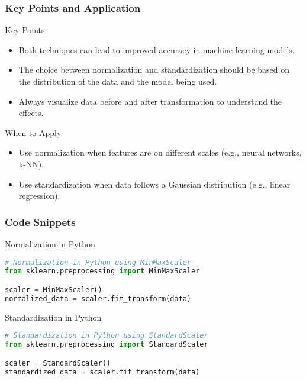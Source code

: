 \documentclass[aspectratio=169]{beamer}
\begin{document}
\begin{frame}[fragile]
    \frametitle{Key Points and Application}
    \begin{block}{Key Points}
        \begin{itemize}
            \item Both techniques can lead to improved accuracy in machine learning models.
            \item The choice between normalization and standardization should be based on the distribution of the data and the model being used.
            \item Always visualize data before and after transformation to understand the effects.
        \end{itemize}
    \end{block}
    
    \begin{block}{When to Apply}
        \begin{itemize}
            \item Use normalization when features are on different scales (e.g., neural networks, k-NN).
            \item Use standardization when data follows a Gaussian distribution (e.g., linear regression).
        \end{itemize}
    \end{block}
\end{frame}

\begin{frame}[fragile]
    \frametitle{Code Snippets}
    \begin{block}{Normalization in Python}
        \begin{lstlisting}[language=Python]
# Normalization in Python using MinMaxScaler
from sklearn.preprocessing import MinMaxScaler

scaler = MinMaxScaler()
normalized_data = scaler.fit_transform(data)
        \end{lstlisting}
    \end{block}

    \begin{block}{Standardization in Python}
        \begin{lstlisting}[language=Python]
# Standardization in Python using StandardScaler
from sklearn.preprocessing import StandardScaler

scaler = StandardScaler()
standardized_data = scaler.fit_transform(data)
        \end{lstlisting}
    \end{block}
\end{frame}
\end{document}
